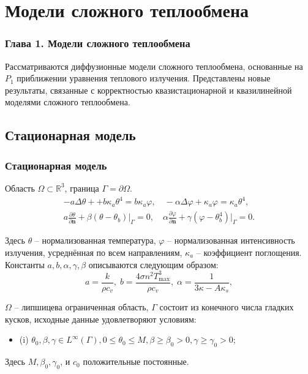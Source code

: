 \section{Модели сложного теплообмена}\label{sec:$p_1$}
\begin{frame}
    \frametitle{Глава 1. Модели сложного теплообмена}
    Рассматриваются диффузионные модели сложного теплообмена, основанные
    на $P_1$ приближении уравнения теплового излучения.
    Представлены новые результаты, связанные с корректностью квазистационарной
    и квазилинейной моделями сложного теплообмена.
\end{frame}
\note{

}

\subsection{Стационарная модель}\label{subsec:st}
\begin{frame}
    \frametitle{Стационарная модель}
    Область $\Omega \subset \mathbb{R}^3$, граница  $\Gamma = \partial \Omega$.
    \begin{gather}
        -a \Delta \theta + + b \kappa_a \theta^4 =  b \kappa_a \varphi,
        \quad
        - \alpha \Delta \varphi + \kappa_a \varphi = \kappa_a \theta^4,  \label{eq:pres:1}\\
        a \frac{\partial \theta}{\partial \mathbf{n}}
        +\left.\beta\left(\theta-\theta_{b}\right)\right|_{\Gamma}=0,
        \quad
        \alpha \frac{\partial \varphi}{\partial \mathbf{n}} + \gamma
        (\varphi-\theta_b^4)|_{\Gamma} = 0. \label{eq:pres:2}
    \end{gather}

    Здесь $\theta$ -- нормализованная температура, $\varphi$ -- нормализованная интенсивность излучения,
    усреднённая по всем направлениям, $\kappa_a$ -- коэффициент поглощения.
    Константы $a, b, \alpha, \gamma, \beta$ описываются следующим образом:
    \[
        a = \frac{k}{\rho c_v}, \; b = \frac{4 \sigma n^2 T^3_{\max}}{\rho c_v}, \;
        \alpha = \frac{1}{3\kappa -A \kappa_s},
    \]



    $\Omega$ -- липшицева ограниченная область, $\Gamma$ состоит из конечного числа гладких кусков,
    исходные данные удовлетворяют условиям:
    \begin{itemize}
        \item (i) $\theta_{0}, \beta, \gamma \in L^{\infty}(\Gamma),
        0 \leqslant \theta_{0} \leqslant M, \beta \geqslant \beta_{0}>0, \gamma \geqslant \gamma_{0}>0$;
    \end{itemize}
    Здесь $M, \beta_{0}, \gamma_{0}$, и $c_{0}$ положительные постоянные.
\end{frame}
